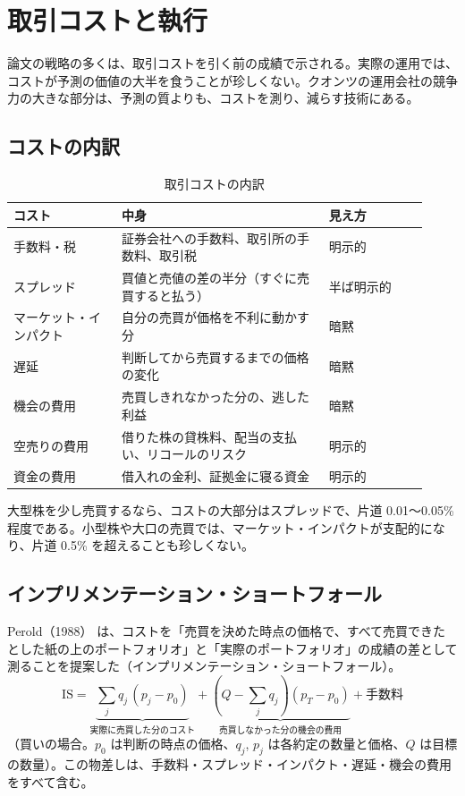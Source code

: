 \chapter{取引コストと執行}
\label{ch:cost}

論文の戦略の多くは、取引コストを引く前の成績で示される。実際の運用では、コストが予測の価値の大半を食うことが珍しくない。クオンツの運用会社の競争力の大きな部分は、予測の質よりも、コストを測り、減らす技術にある。

\section{コストの内訳}

\begin{table}[H]
\centering\small
\caption{取引コストの内訳}
\label{tab:costs}
\begin{tabular}{@{}P{0.24\linewidth}P{0.46\linewidth}P{0.22\linewidth}@{}}
\toprule
コスト & 中身 & 見え方 \\
\midrule
手数料・税 & 証券会社への手数料、取引所の手数料、取引税 & 明示的 \\
スプレッド & 買値と売値の差の半分（すぐに売買すると払う） & 半ば明示的 \\
マーケット・インパクト & 自分の売買が価格を不利に動かす分 & 暗黙 \\
遅延 & 判断してから売買するまでの価格の変化 & 暗黙 \\
機会の費用 & 売買しきれなかった分の、逃した利益 & 暗黙 \\
空売りの費用 & 借りた株の貸株料、配当の支払い、リコールのリスク & 明示的 \\
資金の費用 & 借入れの金利、証拠金に寝る資金 & 明示的 \\
\bottomrule
\end{tabular}
\end{table}

大型株を少し売買するなら、コストの大部分はスプレッドで、片道 0.01〜0.05\% 程度である。小型株や大口の売買では、マーケット・インパクトが支配的になり、片道 0.5\% を超えることも珍しくない。

\section{インプリメンテーション・ショートフォール}

Perold（1988）\cite{perold1988} は、コストを「売買を決めた時点の価格で、すべて売買できたとした紙の上のポートフォリオ」と「実際のポートフォリオ」の成績の差として測ることを提案した（インプリメンテーション・ショートフォール）。
\begin{equation}
\mathrm{IS} = \underbrace{\sum_j q_j\,(p_j - p_0)}_{\text{実際に売買した分のコスト}} + \underbrace{(Q - \textstyle\sum_j q_j)(p_T - p_0)}_{\text{売買しなかった分の機会の費用}} + \text{手数料}
\end{equation}
（買いの場合。$p_0$ は判断の時点の価格、$q_j$, $p_j$ は各約定の数量と価格、$Q$ は目標の数量）。この物差しは、手数料・スプレッド・インパクト・遅延・機会の費用をすべて含む。

